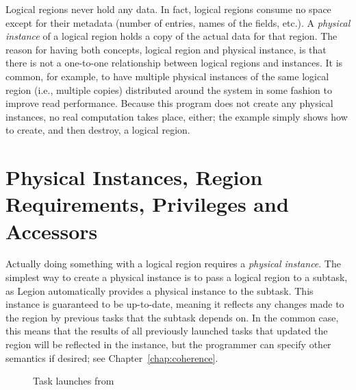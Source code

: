Logical regions never hold any data.  In
fact, logical regions consume no space except for their metadata
(number of entries, names of the fields, etc.).  A {\em physical
  instance} of a logical region holds a copy of the actual data for
that region.  The reason for having both concepts, logical region and
physical instance, is that there is not a one-to-one relationship
between logical regions and instances.  It is common, for example, to
have multiple physical instances of the same logical region (i.e.,
multiple copies) distributed around the system in some fashion to
improve read performance.  Because this program does not create any
physical instances, no real computation takes place, either; the
example simply shows how to create, and then destroy, a logical
region.

\begin{figure}
{\small
  }
\caption{}
\label{fig:lr1}
\end{figure}

\section{Physical Instances, Region Requirements, Privileges and Accessors}
\label{sec:privileges}

Actually doing something with a logical region requires a {\em
  physical instance}.  The simplest way to create a physical instance
is to pass a logical region to a subtask, as Legion automatically
provides a physical instance to the subtask.  This instance is
guaranteed to be up-to-date, meaning it reflects any changes made to
the region by previous tasks that the subtask depends on.  In the
common case, this means that the results of all previously launched
tasks that updated the region will be reflected in the instance, but
the programmer can specify other semantics if desired; see
Chapter~\ref{chap:coherence}.

\begin{figure}
{\small
  }
\caption{Task launches from }
\label{fig:privileges}
\end{figure}


